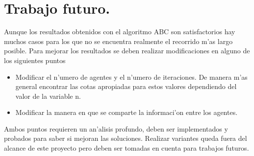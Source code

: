 \documentclass[12pt]{article}
\begin{document}
    \section{Trabajo futuro.}
    Aunque los resultados obtenidos con el algoritmo ABC son satisfactorios
    hay muchos casos para los que no se encuentra realmente el recorrido m'as largo posible.
    Para mejorar los resultados se deben realizar modificaciones en alguno de los siguientes puntos
    \begin{itemize}
        \item Modificar el n'umero de agentes y el n'umero de iteraciones. De manera m'as general
            encontrar las cotas apropiadas para estos
            valores dependiendo del valor de la variable n.
        \item Modificar la manera en que se comparte la informaci'on entre los agentes.
    \end{itemize}

    Ambos puntos requieren un an'alisis profundo, deben ser implementados y probados
    para saber si mejoran las soluciones.
    Realizar variantes queda fuera del alcance de este proyecto pero
    deben ser tomadas en cuenta para trabajos futuros.

    \printbibliography
\end{document}
